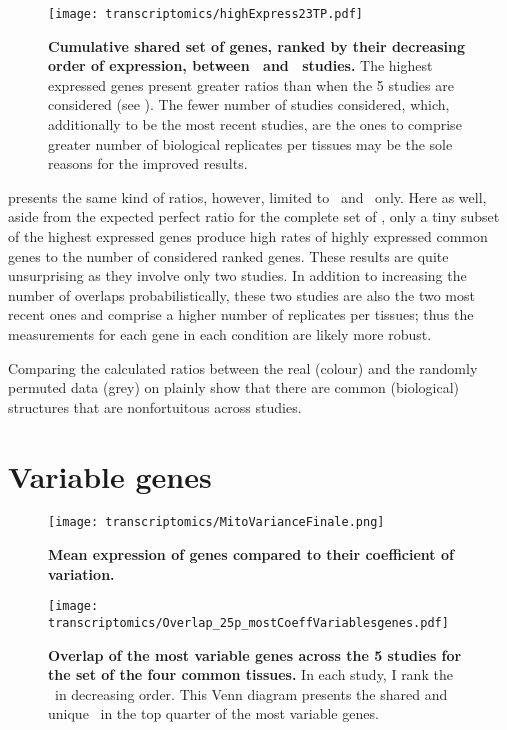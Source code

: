 \begin{figure}[htpb]
    \texttt{[image: transcriptomics/highExpress23TP.pdf]}\centering
    \caption[Cumulative shared set of genes, sorted by their expression, between
    Uhlen and GTEx]{\label{fig:highExpress23T}\textbf{Cumulative shared set of
    genes, ranked by their decreasing order of expression, between \uhlen\ and
    \gtex\ studies.}
    The highest expressed genes present greater ratios than
    when the 5 studies are considered (see ).
    The fewer number of studies considered, which, additionally to be the most
    recent studies, are the ones to comprise greater number of biological
    replicates per tissues may be the sole reasons for the improved results.}
\end{figure}

 presents the same kind of ratios,
however, limited to \uhlen\ and \gtex\ only.
Here as well, aside from the expected perfect ratio for the complete set of
\pcgs,
only a tiny subset of the highest expressed genes produce high rates of
highly expressed common genes to the number of considered ranked genes.
These results are quite unsurprising as they involve only two studies.
In addition to increasing the number of overlaps probabilistically,
these two studies are also the two most recent ones
and comprise a higher number of replicates per tissues;
thus the measurements for each gene in each condition are likely more robust.

Comparing the calculated ratios between the real (colour) and
the randomly permuted data (grey)
on 
plainly show that there are common (biological) structures
that are nonfortuitous across studies.


\section{Variable genes}

\begin{sidewaysfigure}[htpb]
    \texttt{[image: transcriptomics/MitoVarianceFinale.png]}\centering
    \caption[Mean expression of genes compared to their coefficient of variation]%
    {\label{fig:MitoVar}\textbf{Mean expression of genes compared to their
    coefficient of variation.}}
\end{sidewaysfigure}

\begin{figure}[!htpb]
    \texttt{[image: transcriptomics/Overlap\_25p\_mostCoeffVariablesgenes.pdf]}\centering
    \caption[Overlap of the most variables genes across the 5 studies for the set
    of four common tissues]{\label{fig:vennMostVar4T}\textbf{Overlap of the most
    variable genes across the 5 studies for the set of the four common tissues.}
    In each study, I rank the \pcgs\ in decreasing order.
    This Venn diagram presents the shared and unique \pcgs\ in the top
    quarter of the most variable genes.
    }
\end{figure}

